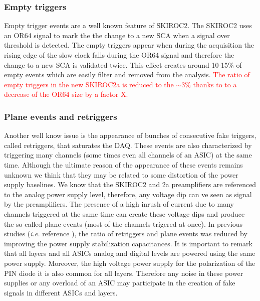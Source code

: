 \documentclass[a4paper,11pt]{article}
\newcommand{\todo}[1]{\textcolor{red}{{#1}}}
\begin{document}
\subsubsection*{Empty triggers}

Empty trigger events are a well known feature of SKIROC2. The SKIROC2 uses
an OR64 signal to mark the the change to a new SCA when a signal over threshold is
detected. The empty triggers appear when during
the acquisition the rising edge of the slow clock falls during the OR64 signal
and therefore the change to a new SCA is validated twice.
This effect creates around 10-15\% of empty events which are easily filter and removed from the
analysis. \todo{The ratio of empty triggers in the new SKIROC2a is reduced to the $\sim3\%$
thanks to to a decrease of the OR64 size by a factor X.}

\subsubsection*{Plane events and retriggers}

Another well know issue is the appearance of bunches of consecutive fake triggers, called retriggers,
that saturates the DAQ. These events are also
characterized by triggering many channels (some times even all channels of an ASIC) at the same time.
Although the ultimate reason of the appearance of these events remains unknown we
think that they may be related to some distortion of the
power supply baselines. We know that the SKIROC2 and 2a preamplifiers are referenced to the analog power supply level,
therefore, any voltage dip can ve seen as signal by the preamplifiers. The presence of a high inrush of current
due to many channels triggered at the same time can create these voltage dips
and produce the so called plane events (most of the channels trigered at once).
In previous studies ({\it i.e.} reference \cite{Amjad:2014tha}), the ratio of retriggers and plane events
was reduced by improving the power supply stabilization capacitances. It is important to remark that
all layers and all ASICs analog and digital levels are powered using the same power supply.
Moreover, the high voltage power supply for the polarization of the PIN diode it is also common for all layers.
Therefore any noise in
these power supplies or any overload of an ASIC may participate in the creation of fake signals
in different ASICs and layers.
\end{document}
